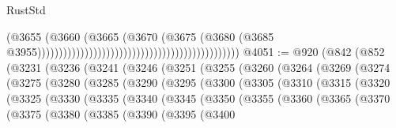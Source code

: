 \begin{lexlean}{RustStd}
\begin{coremodule}
                                                                                    (@3655
                                                                                      (@3660
                                                                                        (@3665
                                                                                          (@3670
                                                                                            (@3675
                                                                                              (@3680
                                                                                                (@3685
                                                                                                  @3955)))))))))))))))))))))))))))))))))))))))))))))))
@4051 := @920
    (@842
      (@852
        (@3231
          (@3236
            (@3241
              (@3246
                (@3251
                  (@3255
                    (@3260
                      (@3264
                        (@3269
                          (@3274
                            (@3275
                              (@3280
                                (@3285
                                  (@3290
                                    (@3295
                                      (@3300
                                        (@3305
                                          (@3310
                                            (@3315
                                              (@3320
                                                (@3325
                                                  (@3330
                                                    (@3335
                                                      (@3340
                                                        (@3345
                                                          (@3350
                                                            (@3355
                                                              (@3360
                                                                (@3365
                                                                  (@3370
                                                                    (@3375
                                                                      (@3380
                                                                        (@3385
                                                                          (@3390
                                                                            (@3395
                                                                              (@3400

\end{coremodule}
\end{lexlean}
